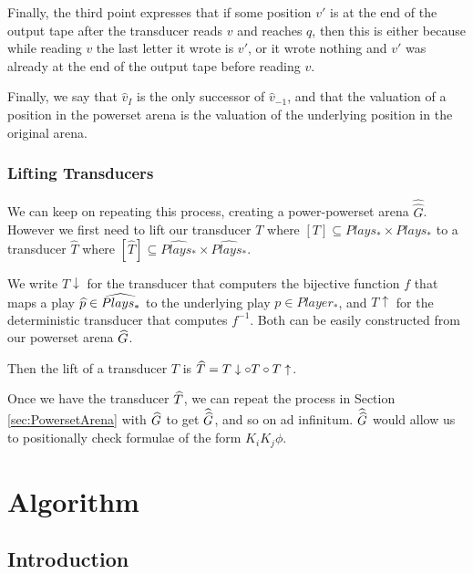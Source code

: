 \documentclass[10pt, a4paper]{report}
\begin{document}
Finally, the third point expresses that if some position $v'$ is at the end of
the output tape after the transducer reads $v$ and reaches $q$, then this is either
because while reading $v$ the last letter it wrote is $v'$, or it wrote nothing
and $v'$ was already at the end of the output tape before reading $v$. 

Finally, we say that $\widehat{v}_I$ is the only successor of
$\widehat{v}_{-1}$, and that the valuation of a position in the powerset arena
is the valuation of the underlying position in the original arena. 

\subsection{Lifting Transducers}
\label{sec:LiftingTransducers}

We can keep on repeating this process, creating a power-powerset arena
$\widehat{\widehat{G}}$. However we first need to lift our transducer $T$ where
$[T] \subseteq Plays_\ast \times Plays_\ast$ to a transducer $\widehat{T}$ where
$[\widehat{T}] \subseteq \widehat{Plays_\ast} \times \widehat{Plays_\ast}$.

We write $T\downarrow$ for the transducer that computers the bijective function
$f$ that maps a play $\widehat{p} \in \widehat{Plays_\ast}$ to the underlying play $p
\in Player_\ast$, and $T\uparrow$ for the deterministic transducer that computes
$f^{-1}$. Both can be easily constructed from our powerset arena $\widehat{G}$.

Then the lift of a transducer $T$ is $\widehat{T} = T\downarrow \circ T \circ
T\uparrow$.

Once we have the transducer $\widehat{T}$, we can repeat the process in Section
\ref{sec:PowersetArena} with $\widehat{G}$ to get $\widehat{\widehat{G}}$, and so on ad
infinitum. $\widehat{\widehat{G}}$ would allow us to positionally check formulae of the
form $K_i K_j \phi$.

\newpage

\chapter{Algorithm}

\section{Introduction}

\begin{wrapfigure}{r}{0.2\textwidth}
  \centering
  \caption{}
  \label{fig:introgossip}
\end{wrapfigure}
\end{document}
